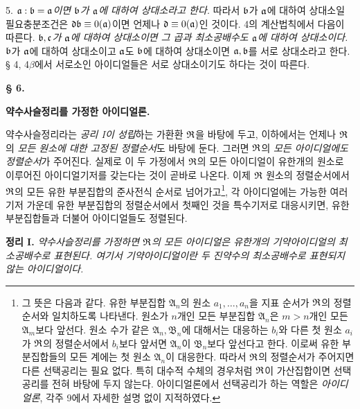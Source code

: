 5. \emph{\(\mathfrak{a}:\mathfrak{b}=\mathfrak{a}\)이면 \(\mathfrak{b}\)가 \(\mathfrak{a}\)에 대하여 상대소라고 한다.} 따라서 \(\mathfrak{b}\)가 \(\mathfrak{a}\)에 대하여 상대소일 필요충분조건은 \(\mathfrak{d}\mathfrak{b}\equiv0(\mathfrak{a})\)이면 언제나 \(\mathfrak{d}\equiv0(\mathfrak{a})\)인 것이다. 4의 계산법칙에서 다음이 따른다. \emph{\(\mathfrak{b},\mathfrak{c}\)가 \(\mathfrak{a}\)에 대하여 상대소이면 그 곱과 최소공배수도 \(\mathfrak{a}\)에 대하여 상대소이다.} \(\mathfrak{b}\)가 \(\mathfrak{a}\)에 대하여 상대소이고 \(\mathfrak{a}\)도 \(\mathfrak{b}\)에 대하여 상대소이면 \(\mathfrak{a},\mathfrak{b}\)를 서로 상대소라고 한다. § 4, 4\(\beta\)에서 서로소인 아이디얼들은 서로 상대소이기도 하다는 것이 따른다.

\setcounter{footnote}{25}

\begin{center}
{\bfseries\large § 6.\par}
\vspace{0.35em}
{\bfseries\large 약수사슬정리를 가정한 아이디얼론.\par}
\end{center}

약수사슬정리라는 \emph{공리 I이 성립}하는 가환환 \(\mathfrak{R}\)을 바탕에 두고, 이하에서는 언제나 \(\mathfrak{R}\)의 \emph{모든 원소에 대한 고정된 정렬순서}도 바탕에 둔다. 그러면 \(\mathfrak{R}\)의 \emph{모든 아이디얼에도 정렬순서}가 주어진다. 실제로 이 두 가정에서 \(\mathfrak{R}\)의 모든 아이디얼이 유한개의 원소로 이루어진 아이디얼기저를 갖는다는 것이 곧바로 나온다. 이제 \(\mathfrak{R}\) 원소의 정렬순서에서 \(\mathfrak{R}\)의 모든 유한 부분집합의 준사전식 순서로 넘어가고\footnote{그 뜻은 다음과 같다. 유한 부분집합 \(\mathfrak A_n\)의 원소 \(a_1,\ldots,a_n\)을 지표 순서가 \(\mathfrak{R}\)의 정렬순서와 일치하도록 나타낸다. 원소가 \(n\)개인 모든 부분집합 \(\mathfrak A_n\)은 \(m>n\)개인 모든 \(\mathfrak A_m\)보다 앞선다. 원소 수가 같은 \(\mathfrak A_n,\mathfrak B_n\)에 대해서는 대응하는 \(b_i\)와 다른 첫 원소 \(a_i\)가 \(\mathfrak{R}\)의 정렬순서에서 \(b_i\)보다 앞서면 \(\mathfrak A_n\)이 \(\mathfrak B_n\)보다 앞선다고 한다. 이로써 유한 부분집합들의 모든 계에는 첫 원소 \(\mathfrak A_n\)이 대응한다. 따라서 \(\mathfrak{R}\)의 정렬순서가 주어지면 다른 선택공리는 필요 없다. 특히 대수적 수체의 경우처럼 \(\mathfrak{R}\)이 가산집합이면 선택공리를 전혀 바탕에 두지 않는다. 아이디얼론에서 선택공리가 하는 역할은 \emph{아이디얼론}, 각주 9에서 자세한 설명 없이 지적하였다.}, 각 아이디얼에는 가능한 여러 기저 가운데 유한 부분집합의 정렬순서에서 첫째인 것을 특수기저로 대응시키면, 유한 부분집합들과 더불어 아이디얼들도 정렬된다.

\textbf{정리 I.} \emph{약수사슬정리를 가정하면 \(\mathfrak{R}\)의 모든 아이디얼은 유한개의 기약아이디얼의 최소공배수로 표현된다. 여기서 기약아이디얼이란 두 진약수의 최소공배수로 표현되지 않는 아이디얼이다.}

